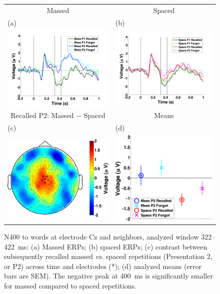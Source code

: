 \begin{figure}[hp]
  \centering
  \begin{tabular}{cc}
  Massed & Spaced \\
  \multicolumn{1}{l}{(a)} & \multicolumn{1}{l}{(b)} \\
  \includegraphics[width=.35\textwidth]{./figs/exp1/tla_single_ga_word_RgH_rc_mass_p1_word_RgH_fo_mass_p1_word_RgH_rc_mass_p2_word_RgH_fo_mass_p2_C_-200_1000_legend_xylabel} &
  \includegraphics[width=.35\textwidth]{./figs/exp1/tla_single_ga_word_RgH_rc_spac_p1_word_RgH_fo_spac_p1_word_RgH_rc_spac_p2_word_RgH_fo_spac_p2_C_-200_1000_legend_xylabel} \\
  Recalled P2: Massed $-$ Spaced & Means \\
  \multicolumn{1}{l}{(c)} & \multicolumn{1}{l}{(d)} \\
  \includegraphics[width=.29\textwidth]{./figs/exp1/tla_topocont_ga_word_RgH_rc_mass_p2vsword_RgH_rc_spac_p2_C_322_422_-2p0_2p0_cb} &
  \includegraphics[width=.30\textwidth]{./figs/exp1/tla_line_ga_word_RgH_rc_mass_p2_word_RgH_fo_mass_p2_word_RgH_rc_spac_p2_word_RgH_fo_spac_p2_C_322_422_ylabel} \\
  \end{tabular}
  \caption{N400 to words at electrode Cz and neighbors, analyzed window 322--422~ms: (a) Massed ERPs; (b) spaced ERPs; (c) contrast between subsequently recalled massed \textit{vs.} spaced repetitions (Presentation 2, or P2) across time and electrodes (*); (d) analyzed means (error bars are SEM).  The negative peak at 400~ms is significantly smaller for massed compared to spaced repetitions.}
  \label{fig:N400}
\end{figure}

